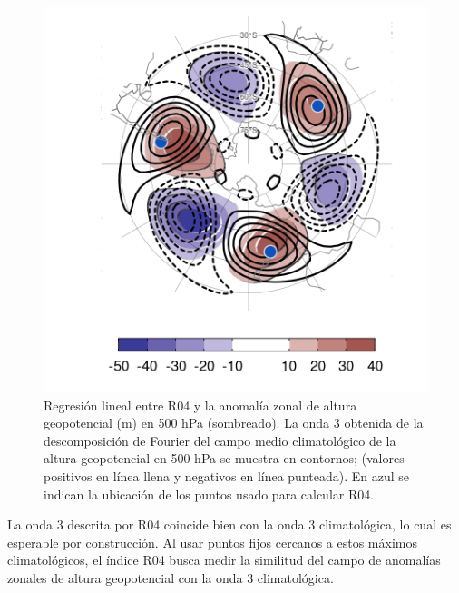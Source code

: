 \documentclass[12pt,oneside,a4paper]{reedthesis}
\begin{document}
\begin{figure}

{\centering \includegraphics{figures/15-onda3/raphael-regr-1} 

}

\caption{Regresión lineal entre R04 y la anomalía zonal de altura geopotencial (m) en 500 hPa (sombreado). La onda 3 obtenida de la descomposición de Fourier del campo medio climatológico de la altura geopotencial en 500 hPa se muestra en contornos; (valores positivos en línea llena y negativos en línea punteada). En azul se indican la ubicación de los puntos usado para calcular R04.}\label{fig:raphael-regr}
\end{figure}



La onda 3 descrita por R04 coincide bien con la onda 3 climatológica, lo cual es esperable por construcción.
Al usar puntos fijos cercanos a estos máximos climatológicos, el índice R04 busca medir la similitud del campo de anomalías zonales de altura geopotencial con la onda 3 climatológica.
\end{document}
